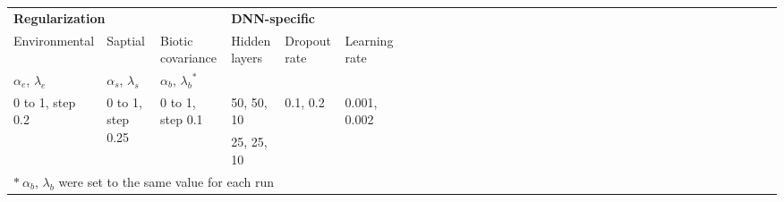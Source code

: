 \documentclass[10pt]{article}
\begin{document}
    \begin{tabular}{*{6}{l l l |l l |l}}
    \multicolumn{3}{l|}{\textbf{Regularization} }&  \multicolumn{2}{l|}{\textbf{DNN-specific} }&  \\
    Environmental  & Saptial & Biotic covariance & \multirow{2}{*}{Hidden layers}  & \multirow{2}{*}{Dropout rate}  & \multirow{2}{*}{Learning rate}  \\
    $\alpha_e$, $\lambda_e$ & $\alpha_{s}$, $\lambda_{s}$ & $\alpha_{b}$, ${\lambda_{b}}^*$ & & & \\
    \toprule
    \multirow{2}{*}{0 to 1, step 0.2 } & \multirow{2}{*}{0 to 1, step 0.25}  & \multirow{2}{*}{0 to 1, step 0.1}  & 50, 50, 10  & \multirow{2}{*}{0.1, 0.2}  & \multirow{2}{*}{0.001, 0.002}  \\
    & & & 25, 25, 10 &\\
    \bottomrule
    \multicolumn{6}{l}{$*\:\alpha_{b}$, $\lambda_{b}$ were set to the same value for each run}\\
    \end{tabular}
    
    
\end{document}
